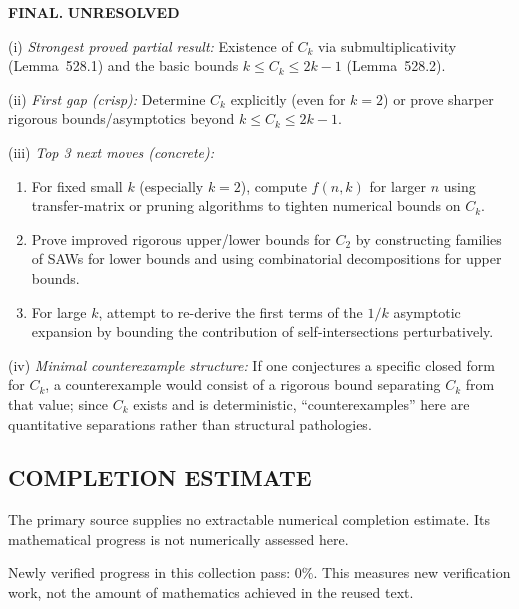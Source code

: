 \bigskip
\noindent\textbf{FINAL.} \textbf{UNRESOLVED}

(i) \emph{Strongest proved partial result:}
Existence of $C_k$ via submultiplicativity (Lemma~528.1) and the basic bounds $k\le C_k\le 2k-1$ (Lemma~528.2).

(ii) \emph{First gap (crisp):}
Determine $C_k$ explicitly (even for $k=2$) or prove sharper rigorous bounds/asymptotics beyond $k\le C_k\le 2k-1$.

(iii) \emph{Top 3 next moves (concrete):}
\begin{enumerate}
\item For fixed small $k$ (especially $k=2$), compute $f(n,k)$ for larger $n$ using transfer-matrix or pruning algorithms to tighten numerical bounds on $C_k$.
\item Prove improved rigorous upper/lower bounds for $C_2$ by constructing families of SAWs for lower bounds and using combinatorial decompositions for upper bounds.
\item For large $k$, attempt to re-derive the first terms of the $1/k$ asymptotic expansion by bounding the contribution of self-intersections perturbatively.
\end{enumerate}

(iv) \emph{Minimal counterexample structure:}
If one conjectures a specific closed form for $C_k$, a counterexample would consist of a rigorous bound separating $C_k$ from that value; since $C_k$ exists and is deterministic, ``counterexamples'' here are quantitative separations rather than structural pathologies.



\subsection*{COMPLETION ESTIMATE}
The primary source supplies no extractable numerical completion estimate. Its mathematical progress is not numerically assessed here.

Newly verified progress in this collection pass: $0\%$. This measures new verification work, not the amount of mathematics achieved in the reused text.
